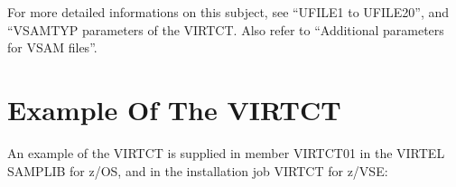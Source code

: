 \documentclass[letterpaper,10pt,english]{sphinxmanual}
\begin{document}
For more detailed informations on this subject, see “UFILE1 to UFILE20”, and “VSAMTYP parameters of the VIRTCT. Also refer to “Additional parameters for VSAM files”.

\newpage


\section{Example Of The VIRTCT}
\label{\detokenize{Installation_Guide:example-of-the-virtct}}
An example of the VIRTCT is supplied in member VIRTCT01 in the VIRTEL SAMPLIB for z/OS, and in the installation job VIRTCT for z/VSE:

\begin{sphinxVerbatim}[commandchars=\\\{\}]
 
  
         
             
           
             
            
         
         
          
          
         
         
         

\end{sphinxVerbatim}
\end{document}
